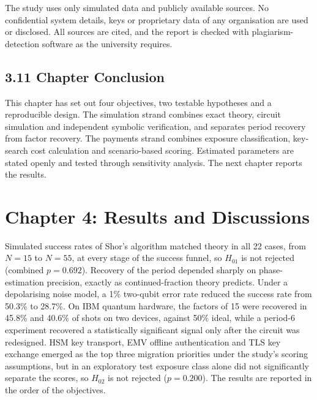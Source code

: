 \documentclass[12pt,oneside]{report}
\begin{document}
The study uses only simulated data and publicly available sources. No confidential system details, keys or proprietary data of any organisation are used or disclosed. All sources are cited, and the report is checked with plagiarism-detection software as the university requires.
\par

\subsection*{3.11 Chapter Conclusion}

This chapter has set out four objectives, two testable hypotheses and a reproducible design. The simulation strand combines exact theory, circuit simulation and independent symbolic verification, and separates period recovery from factor recovery. The payments strand combines exposure classification, key-search cost calculation and scenario-based scoring. Estimated parameters are stated openly and tested through sensitivity analysis. The next chapter reports the results.
\par

\newpage
\section*{Chapter 4: Results and Discussions}

Simulated success rates of Shor's algorithm matched theory in all 22 cases, from $N = 15$ to $N = 55$, at every stage of the success funnel, so $H_{01}$ is not rejected (combined $p = 0.692$). Recovery of the period depended sharply on phase-estimation precision, exactly as continued-fraction theory predicts. Under a depolarising noise model, a 1\% two-qubit error rate reduced the success rate from 50.3\% to 28.7\%. On IBM quantum hardware, the factors of 15 were recovered in 45.8\% and 40.6\% of shots on two devices, against 50\% ideal, while a period-6 experiment recovered a statistically significant signal only after the circuit was redesigned. HSM key transport, EMV offline authentication and TLS key exchange emerged as the top three migration priorities under the study's scoring assumptions, but in an exploratory test exposure class alone did not significantly separate the scores, so $H_{02}$ is not rejected ($p = 0.200$). The results are reported in the order of the objectives.
\par
\end{document}
